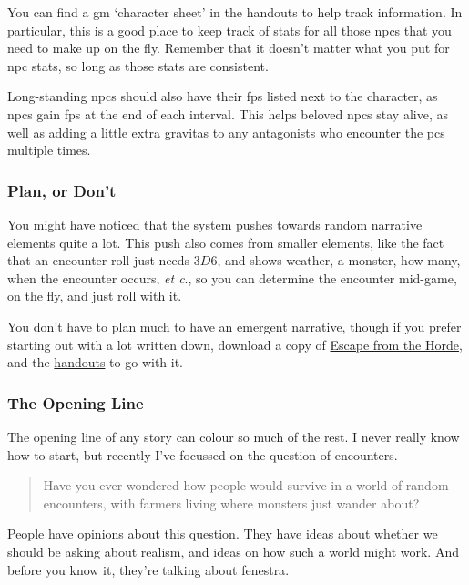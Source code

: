 \begin{multicols}{2}
You can find a \gls{gm} `character sheet' in the handouts to help track information.
In particular, this is a good place to keep track of stats for all those \glspl{npc} that you need to make up on the fly.
Remember that it doesn't matter what you put for \gls{npc} stats, so long as those stats are consistent.

Long-standing \glspl{npc} should also have their \glspl{fp} listed next to the character, as \glspl{npc} gain \glspl{fp} at the end of each \gls{interval}.
This helps beloved \glspl{npc} stay alive, as well as adding a little extra gravitas to any antagonists who encounter the \glspl{pc} multiple times.

\subsubsection{Plan, or Don't}

You might have noticed that the system pushes towards random narrative elements quite a lot.
This push also comes from smaller elements, like the fact that an encounter roll just needs $3D6$, and shows weather, a monster, how many, when the encounter occurs, \textit{et c}., so you can determine the encounter mid-game, on the fly, and just roll with it.

You don't have to plan much to have an emergent narrative, though if you prefer starting out with a lot written down, download a copy of
\href{https://gitlab.com/bindrpg/oneshot/-/jobs/artifacts/master/raw/hardcore_horde_escape.pdf?job=build}{Escape from the Horde}, and the
\href{https://gitlab.com/bindrpg/oneshot/-/jobs/artifacts/master/raw/hardcore_handouts.pdf?job=build}{handouts} to go with it. 

\subsubsection{The Opening Line}

The opening line of any story can colour so much of the rest.
I never really know how to start, but recently I've focussed on the question of encounters.

\begin{quotation}
  Have you ever wondered how people would survive in a world of random encounters, with farmers living where monsters just wander about?
\end{quotation}

People have opinions about this question.
They have ideas about whether we should be asking about realism, and ideas on how such a world might work.
And before you know it, they're talking about \gls{fenestra}.


\end{multicols}
